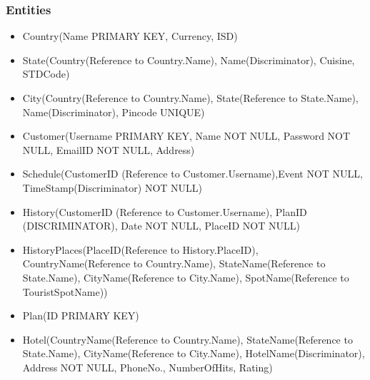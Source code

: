 \documentclass[11pt]{article}
\begin{document}
\subsubsection{Entities}

\begin{itemize}
\item Country(Name PRIMARY KEY, Currency, ISD)
\item State(Country(Reference to Country.Name), Name(Discriminator), Cuisine, STDCode)
\item City(Country(Reference to Country.Name), State(Reference to State.Name), Name(Discriminator), Pincode UNIQUE)
\item Customer(Username PRIMARY KEY, Name NOT NULL, Password NOT NULL, EmailID NOT NULL, Address)
\item Schedule(CustomerID (Reference to Customer.Username),Event NOT NULL, TimeStamp(Discriminator) NOT NULL)
\item History(CustomerID (Reference to Customer.Username), PlanID (DISCRIMINATOR), Date NOT NULL, PlaceID NOT NULL)
\item HistoryPlaces(PlaceID(Reference to History.PlaceID), CountryName(Reference to Country.Name), StateName(Reference to State.Name), CityName(Reference to City.Name), SpotName(Reference to TouristSpotName))
\item Plan(ID PRIMARY KEY)
\item Hotel(CountryName(Reference to Country.Name), StateName(Reference to State.Name), CityName(Reference to City.Name), HotelName(Discriminator), Address NOT NULL, PhoneNo., NumberOfHits, Rating)
\end{itemize}
\end{document}
